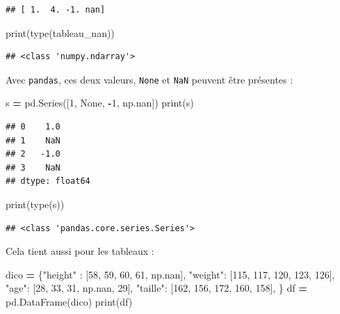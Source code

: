 \documentclass[12pt,]{book}
\newenvironment{Shaded}{\begin{snugshade}}{\end{snugshade}}
\newcommand{\DecValTok}[1]{\textcolor[rgb]{0.00,0.00,0.81}{#1}}
\newcommand{\StringTok}[1]{\textcolor[rgb]{0.31,0.60,0.02}{#1}}
\newcommand{\VariableTok}[1]{\textcolor[rgb]{0.00,0.00,0.00}{#1}}
\newcommand{\OperatorTok}[1]{\textcolor[rgb]{0.81,0.36,0.00}{\textbf{#1}}}
\newcommand{\BuiltInTok}[1]{#1}
\newcommand{\NormalTok}[1]{#1}
\numberwithin{equation}{section}
\numberwithin{countremarque}{section}
\begin{document}
\begin{lstlisting}
## [ 1.  4. -1. nan]
\end{lstlisting}

\begin{Shaded}
\begin{Highlighting}[]
\BuiltInTok{print}\NormalTok{(}\BuiltInTok{type}\NormalTok{(tableau_nan))}
\end{Highlighting}
\end{Shaded}

\begin{lstlisting}
## <class 'numpy.ndarray'>
\end{lstlisting}

Avec \texttt{pandas}, ces deux valeurs, \texttt{None} et \texttt{NaN}
peuvent être présentes :

\begin{Shaded}
\begin{Highlighting}[]
\NormalTok{s }\OperatorTok{=}\NormalTok{ pd.Series([}\DecValTok{1}\NormalTok{, }\VariableTok{None}\NormalTok{, }\OperatorTok{-}\DecValTok{1}\NormalTok{, np.nan])}
\BuiltInTok{print}\NormalTok{(s)}
\end{Highlighting}
\end{Shaded}

\begin{lstlisting}
## 0    1.0
## 1    NaN
## 2   -1.0
## 3    NaN
## dtype: float64
\end{lstlisting}

\begin{Shaded}
\begin{Highlighting}[]
\BuiltInTok{print}\NormalTok{(}\BuiltInTok{type}\NormalTok{(s))}
\end{Highlighting}
\end{Shaded}

\begin{lstlisting}
## <class 'pandas.core.series.Series'>
\end{lstlisting}

Cela tient aussi pour les tableaux :

\begin{Shaded}
\begin{Highlighting}[]
\NormalTok{dico }\OperatorTok{=}\NormalTok{ \{}\StringTok{"height"}\NormalTok{ : [}\DecValTok{58}\NormalTok{, }\DecValTok{59}\NormalTok{, }\DecValTok{60}\NormalTok{, }\DecValTok{61}\NormalTok{, np.nan],}
        \StringTok{"weight"}\NormalTok{: [}\DecValTok{115}\NormalTok{, }\DecValTok{117}\NormalTok{, }\DecValTok{120}\NormalTok{, }\DecValTok{123}\NormalTok{, }\DecValTok{126}\NormalTok{],}
        \StringTok{"age"}\NormalTok{: [}\DecValTok{28}\NormalTok{, }\DecValTok{33}\NormalTok{, }\DecValTok{31}\NormalTok{, np.nan, }\DecValTok{29}\NormalTok{],}
        \StringTok{"taille"}\NormalTok{: [}\DecValTok{162}\NormalTok{, }\DecValTok{156}\NormalTok{, }\DecValTok{172}\NormalTok{, }\DecValTok{160}\NormalTok{, }\DecValTok{158}\NormalTok{],}
\NormalTok{       \} }
\NormalTok{df }\OperatorTok{=}\NormalTok{ pd.DataFrame(dico)}
\BuiltInTok{print}\NormalTok{(df)}
\end{Highlighting}
\end{Shaded}
\end{document}
